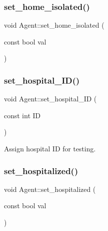 \subsubsection{\texorpdfstring{set\+\_\+home\+\_\+isolated()}{set\_home\_isolated()}}
{\footnotesize\ttfamily void Agent\+::set\+\_\+home\+\_\+isolated (\begin{DoxyParamCaption}\item[{const bool}]{val }\end{DoxyParamCaption})\hspace{0.3cm}{\ttfamily [inline]}}

\mbox{\label{classAgent_acd018fbc754c1a7a6b2a8cdf05455c6c}} 
\subsubsection{\texorpdfstring{set\+\_\+hospital\+\_\+\+I\+D()}{set\_hospital\_ID()}}
{\footnotesize\ttfamily void Agent\+::set\+\_\+hospital\+\_\+\+ID (\begin{DoxyParamCaption}\item[{const int}]{ID }\end{DoxyParamCaption})\hspace{0.3cm}{\ttfamily [inline]}}



Assign hospital ID for testing. 

\mbox{\label{classAgent_a6fadc5ac579265c35a344a7b718fff71}} 
\subsubsection{\texorpdfstring{set\+\_\+hospitalized()}{set\_hospitalized()}}
{\footnotesize\ttfamily void Agent\+::set\+\_\+hospitalized (\begin{DoxyParamCaption}\item[{const bool}]{val }\end{DoxyParamCaption})\hspace{0.3cm}{\ttfamily [inline]}}

\mbox{\label{classAgent_ad5f4b7735883e1145f95ebac41a6ff0c}} 
